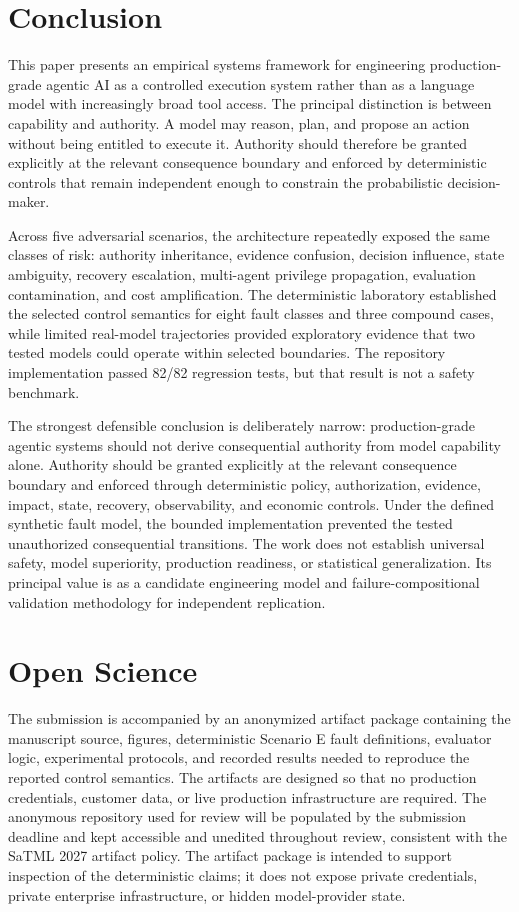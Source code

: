 \documentclass[conference]{IEEEtran}
\begin{document}
\section{Conclusion}
This paper presents an empirical systems framework for engineering production-grade agentic AI as a controlled execution system rather than as a language model with increasingly broad tool access. The principal distinction is between capability and authority. A model may reason, plan, and propose an action without being entitled to execute it. Authority should therefore be granted explicitly at the relevant consequence boundary and enforced by deterministic controls that remain independent enough to constrain the probabilistic decision-maker.

Across five adversarial scenarios, the architecture repeatedly exposed the same classes of risk: authority inheritance, evidence confusion, decision influence, state ambiguity, recovery escalation, multi-agent privilege propagation, evaluation contamination, and cost amplification. The deterministic laboratory established the selected control semantics for eight fault classes and three compound cases, while limited real-model trajectories provided exploratory evidence that two tested models could operate within selected boundaries. The repository implementation passed 82/82 regression tests, but that result is not a safety benchmark.

The strongest defensible conclusion is deliberately narrow: production-grade agentic systems should not derive consequential authority from model capability alone. Authority should be granted explicitly at the relevant consequence boundary and enforced through deterministic policy, authorization, evidence, impact, state, recovery, observability, and economic controls. Under the defined synthetic fault model, the bounded implementation prevented the tested unauthorized consequential transitions. The work does not establish universal safety, model superiority, production readiness, or statistical generalization. Its principal value is as a candidate engineering model and failure-compositional validation methodology for independent replication.

\section*{Open Science}
The submission is accompanied by an anonymized artifact package containing the manuscript source, figures, deterministic Scenario E fault definitions, evaluator logic, experimental protocols, and recorded results needed to reproduce the reported control semantics. The artifacts are designed so that no production credentials, customer data, or live production infrastructure are required. The anonymous repository used for review will be populated by the submission deadline and kept accessible and unedited throughout review, consistent with the SaTML 2027 artifact policy. The artifact package is intended to support inspection of the deterministic claims; it does not expose private credentials, private enterprise infrastructure, or hidden model-provider state.
\end{document}
